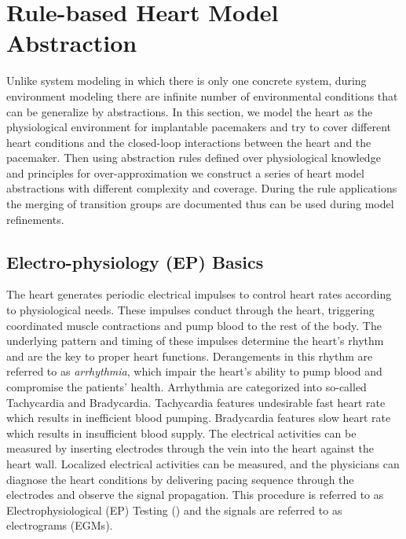 \section{Rule-based Heart Model Abstraction}
\label{ruleBasedHeartModelAbstraction}
Unlike system modeling in which there is only one concrete system, during environment modeling there are infinite number of environmental conditions that can be generalize by abstractions. In this section, we model the heart as the physiological environment for implantable pacemakers and try to cover different heart conditions and the closed-loop interactions between the heart and the pacemaker. Then using abstraction rules defined over physiological knowledge and principles for over-approximation we construct a series of heart model abstractions with different complexity and coverage. During the rule applications the merging of transition groups are documented thus can be used during model refinements.
\subsection{Electro-physiology (EP) Basics}
The heart generates periodic electrical impulses to control heart rates according to physiological needs. These impulses conduct through the heart, triggering coordinated muscle contractions and pump blood to the rest of the body. The underlying pattern and timing of these impulses determine the heart's rhythm and are the key to proper heart functions. Derangements in this rhythm are referred to as \emph{arrhythmia}, which impair the heart's ability to pump blood and compromise the patients' health. Arrhythmia are categorized into so-called \textsf{Tachycardia} and \textsf{Bradycardia}. Tachycardia features undesirable fast heart rate which results in inefficient blood pumping. Bradycardia features slow heart rate which results in insufficient blood supply. The electrical activities can be measured by inserting electrodes through the vein into the heart against the heart wall. Localized electrical activities can be measured, and the physicians can diagnose the heart conditions by delivering pacing sequence through the electrodes and observe the signal propagation. This procedure is referred to as Electrophysiological (EP) Testing  (\cite{josephson}) and the signals are referred to as electrograms (EGMs).

